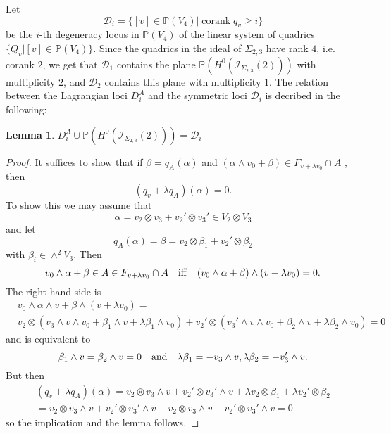 \documentclass[a4paper,11pt]{amsart}
\newtheorem{lemma}[thm]{Lemma}
\theoremstyle{definition}
\numberwithin{equation}{section}
\numberwithin{equation}{section} \theoremstyle{definition}
\begin{document}
 Let 
 \[
 {\mathcal D}_i=\{[v]\in {{\mathbb{P}}}(V_4)|\operatorname{corank} q_v\geq i\}
 \]
 be the $i$-th degeneracy locus in ${{\mathbb{P}}}(V_4)$ of the linear system of quadrics $\{Q_v|[v]\in {{\mathbb{P}}}(V_4)\}$.
 Since the quadrics in the ideal of $\Sigma_{2,3}$ have rank $4$, i.e. corank $2$, we get that  ${\mathcal D}_1$ contains the plane ${{\mathbb{P}}}(H^0({\mathcal I}_{\Sigma_{2,3}}(2)))$ with multiplicity $2$, and 
 ${\mathcal D}_2$ contains this plane with multiplicity $1$.  The relation between the Lagrangian loci $D_i^A$ and the symmetric loci ${\mathcal D}_i$ is decribed in the following:
 \begin{lemma}
 $D_i^A\cup {{\mathbb{P}}}(H^0({\mathcal I}_{\Sigma_{2,3}}(2)))= {\mathcal D}_i$
 \end{lemma}
 \begin{proof} 
 It suffices to show that if $\beta =q_A(\alpha)$ and $(\alpha\wedge v_0+\beta)\in  F_{v+\lambda v_0}\cap A $ , then 
 \[
(q_v+\lambda q_A)(\alpha)=0.
 \]
 To show this we may assume that 
 \[\alpha =v_2\otimes v_3+v_2'\otimes v_3'\in V_2\otimes V_3
 \]
  and let
 \[
 q_A(\alpha)=\beta=v_2\otimes \beta_1+v_2'\otimes \beta_2
 \]
  with $\beta_i\in \wedge^2V_3$.  Then
 \[
 v_0\wedge \alpha+\beta\in A\in F_{v+\lambda v_0}\cap A\quad {\rm iff}\quad  (v_0\wedge \alpha+\beta)\wedge (v+\lambda v_0)=0.
 \]
 The right hand side is
 \begin{eqnarray}\nonumber
 &v_0\wedge \alpha\wedge v+\beta\wedge (v+\lambda v_0)=\\
 \nonumber
 &v_2\otimes (v_3\wedge v\wedge v_0 +\beta_1\wedge v+\lambda \beta_1\wedge v_0)  +v_2'\otimes (v_3'\wedge v\wedge v_0 +\beta_2\wedge v+\lambda \beta_2\wedge v_0) =0
 \end{eqnarray}
 and is equivalent to 
 \[
  \beta_1\wedge v= \beta_2\wedge v=0\quad {\rm and}\quad \lambda  \beta_1= -v_3\wedge v,  \lambda  \beta_2= -v_3'\wedge v.
 \]
  But then 
   \begin{eqnarray}\nonumber
  (q_v+\lambda q_A)( \alpha)=v_2\otimes v_3\wedge v+v_2'\otimes v_3'\wedge v+\lambda v_2\otimes \beta_1+\lambda v_2'\otimes \beta_2\\
 \nonumber =v_2\otimes v_3\wedge v+v_2'\otimes v_3'\wedge v- v_2\otimes v_3\wedge v- v_2'\otimes v_3'\wedge v=0
  
   \end{eqnarray}
  so the implication  and the lemma follows. 
   
  \end{proof}
  
\end{document}
